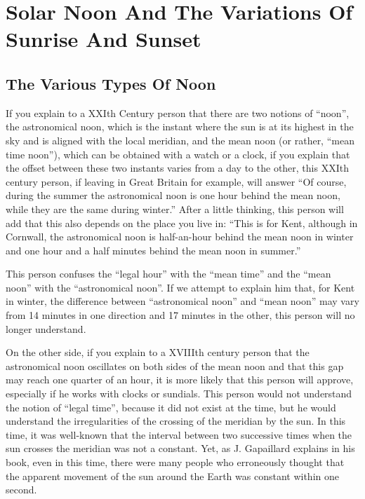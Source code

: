 \documentclass[a4paper]{article}
\newenvironment{texte}{\rmfamily}{}
\begin{document}
\begin{texte}
\section{Solar Noon And The Variations Of Sunrise And Sunset}

\subsection{The Various Types Of Noon}

%

If you explain to a XXIth Century person that there are
two notions of ``noon'', the astronomical noon, which is
the instant where the sun is at its highest in the 
sky and is aligned with the local meridian, and the
mean noon (or rather, ``mean time noon''), which can
be obtained with a watch or a clock, if you explain that
the offset between these two instants varies from a
day to the other, this XXIth century person, if leaving
in Great Britain for example, will answer
``Of course, during the summer the astronomical noon is
one hour behind the mean noon, while they are the same
during winter.'' After a little thinking, this person
will add that this also depends on the place you live
in: ``This is for Kent, although in Cornwall, the
astronomical noon is half-an-hour behind
the mean noon in winter and one hour and a half minutes behind
the mean noon in summer.''

This person confuses the ``legal hour'' with the ``mean time''
and the ``mean noon'' with the ``astronomical noon''.
If we attempt to explain him that, for Kent in winter,
the difference between ``astronomical noon'' and ``mean noon''
may vary from 14 minutes in one direction
and 17 minutes in the other, this person
will no longer understand.

On the other side, if you explain to a XVIIIth century
person that the astronomical noon oscillates on both
sides of the mean noon and that this gap may reach
one quarter of an hour, it is more likely
that this person will approve, especially if he works
with clocks or sundials. This person would not understand
the notion of ``legal time'', because it did not exist
at the time, but he would understand the irregularities
of the crossing of the meridian by the sun.
In this time, it was well-known that the interval
between two successive times when the sun crosses
the meridian was not a constant. Yet, as J. Gapaillard
explains in his book, even in this time, there were many people
who erroneously thought that the apparent movement of
the sun around the Earth was constant within one second.


\end{texte}
\end{document}

